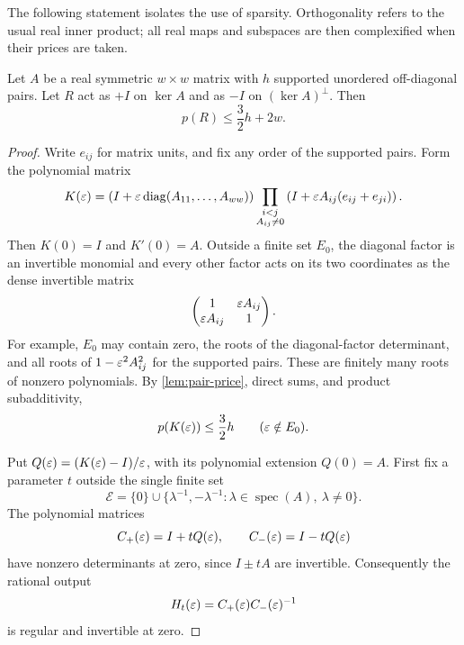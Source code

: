 The following statement isolates the use of sparsity.  Orthogonality
refers to the usual real inner product; all real maps and subspaces
are then complexified when their prices are taken.

\begin{lemma}
\label{reflect:sparse-reflection}
Let $A$ be a real symmetric $w\times w$ matrix with $h$ supported
unordered off-diagonal pairs.  Let $R$ act as $+I$ on $\ker A$ and
as $-I$ on $(\ker A)^\perp$.  Then
\[
 p(R)\leq \frac32h+2w.
\]
\end{lemma}

\begin{proof}
Write $e_{ij}$ for matrix units, and fix any order of the supported
pairs.  Form the polynomial matrix
\begin{equation}
 K(\varepsilon)=\left(I+\varepsilon\operatorname{diag}(A_{11},\ldots,A_{ww})\right)
       \prod_{\substack{i<j\\A_{ij}\ne0}}
       \left(I+\varepsilon A_{ij}(e_{ij}+e_{ji})\right).
 \label{reflect:polynomial-product}
\end{equation}
Then $K(0)=I$ and $K'(0)=A$.  Outside a finite set $E_0$,
the diagonal factor is an invertible monomial and every other factor
acts on its two coordinates as the dense invertible matrix
\[
 \begin{pmatrix}1&\varepsilon A_{ij}\\\varepsilon A_{ij}&1\end{pmatrix}.
\]
For example, $E_0$ may contain zero, the roots of the diagonal-factor
determinant, and all roots of $1-\varepsilon^2A_{ij}^2$ for the supported
pairs.  These are finitely many roots of nonzero polynomials.
By \cref{lem:pair-price}, direct sums, and product subadditivity,
\begin{equation}
 p(K(\varepsilon))\leq \frac32h\qquad(\varepsilon\notin E_0).
 \label{reflect:product-price}
\end{equation}

Put $Q(\varepsilon)=(K(\varepsilon)-I)/\varepsilon$, with its polynomial extension
$Q(0)=A$.  First fix a parameter $t$ outside the single finite set
\begin{equation}
 \mathcal E=\{0\}\cup
 \{\lambda^{-1},-\lambda^{-1}:
                    \lambda\in\operatorname{spec}(A),\ \lambda\ne0\}.
 \label{reflect:outer-exceptions}
\end{equation}
The polynomial matrices
\[
 C_+(\varepsilon)=I+tQ(\varepsilon),\qquad C_-(\varepsilon)=I-tQ(\varepsilon)
\]
have nonzero determinants at zero, since $I\pm tA$ are invertible.
Consequently the rational output
\[
 H_t(\varepsilon)=C_+(\varepsilon)C_-(\varepsilon)^{-1}
\]
is regular and invertible at zero.


\end{proof}
